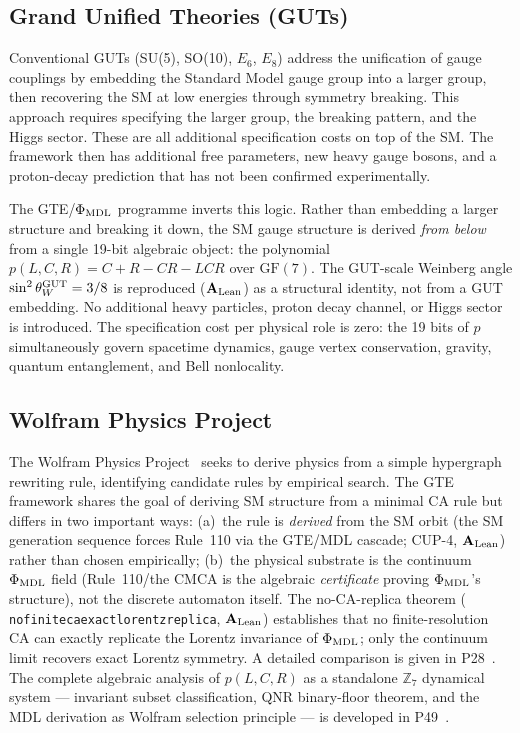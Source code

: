 \documentclass[11pt]{article}
\newcommand{\lean}[1]{%
  \penalty-100
  \begingroup\def\_{{\textunderscore\allowbreak}}\texttt{#1}\endgroup}
\newcommand{\CatAL}{\ensuremath{\textbf{A}_{\rm Lean}}}
\begin{document}
\subsection{Grand Unified Theories (GUTs)}

\begin{sloppypar}
Conventional GUTs (SU(5), SO(10), $E_6$, $E_8$) address the unification of gauge
couplings by embedding the Standard Model gauge group into a larger group, then
recovering the SM at low energies through symmetry breaking.  This approach requires
specifying the larger group, the breaking pattern, and the Higgs sector.
These are all additional specification costs on top of the SM.
The framework then has additional free parameters,
new heavy gauge bosons, and a proton-decay prediction that has not been confirmed
experimentally.
\end{sloppypar}

The GTE/$\Phi_{\rm MDL}$ programme inverts this logic.  Rather than embedding a larger
structure and breaking it down, the SM gauge structure is derived \emph{from below} from
a single 19-bit algebraic object: the polynomial $p(L,C,R) = C + R - CR - LCR$ over
$\mathrm{GF}(7)$.  The GUT-scale Weinberg angle $\sin^2\theta_W^{\rm GUT} = 3/8$ is
reproduced ($\CatAL$) as a structural identity, not from a GUT embedding.  No
additional heavy particles, proton decay channel, or Higgs sector is introduced.
The specification cost per physical role is zero: the 19 bits of $p$ simultaneously
govern spacetime dynamics, gauge vertex conservation, gravity, quantum entanglement,
and Bell nonlocality.

\subsection{Wolfram Physics Project}

The Wolfram Physics Project~\cite{Wolfram2002} seeks to derive physics from a simple
hypergraph rewriting rule, identifying candidate rules by empirical search.  The GTE
framework shares the goal of deriving SM structure from a minimal CA rule but differs in
two important ways: (a)~the rule is \emph{derived} from the SM orbit (the SM generation
sequence forces Rule~110 via the GTE/MDL cascade; CUP-4, $\CatAL$) rather than chosen
empirically; (b)~the physical substrate is the continuum $\Phi_{\rm MDL}$ field
(Rule~110/the CMCA is the algebraic \emph{certificate} proving $\Phi_{\rm MDL}$'s
structure), not the discrete automaton itself.  The no-CA-replica theorem
(\lean{no\_finite\_ca\_exact\_lorentz\_replica}, $\CatAL$) establishes that no
finite-resolution CA can exactly replicate the Lorentz invariance of $\Phi_{\rm MDL}$;
only the continuum limit recovers exact Lorentz symmetry.  A detailed comparison is
given in P28~\cite{SpivackCompUniversality}.  The complete algebraic analysis of
$p(L,C,R)$ as a standalone $\mathbb{Z}_7$ dynamical system --- invariant subset
classification, QNR binary-floor theorem, and the MDL derivation as Wolfram selection
principle --- is developed in P49~\cite{SpivackGTEPolynomialWolfram}.
\end{document}
